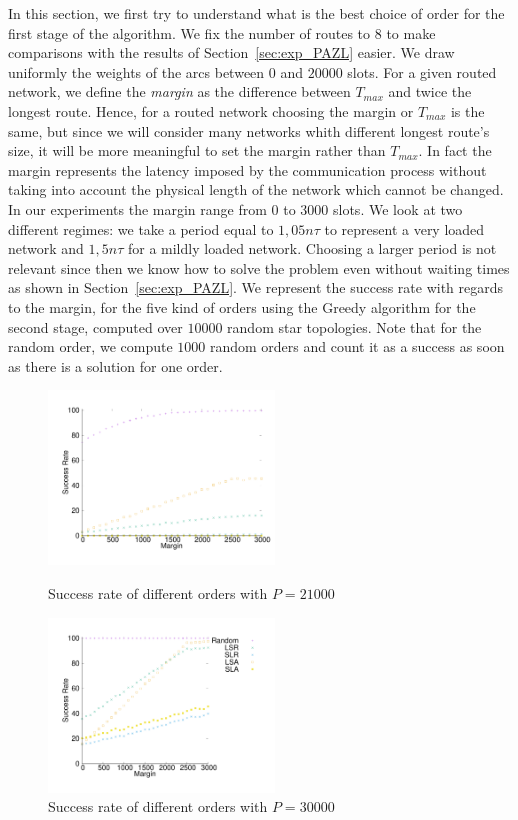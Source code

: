 \documentclass[a4paper,10pt]{article}
\begin{document}
    
    In this section, we first try to understand what is the best choice of order for the first stage of the algorithm.
    We fix the number of routes to $8$ to make comparisons with the results of Section~\ref{sec:exp_PAZL} easier. 
    We draw uniformly the weights of the arcs between $0$ and $20000$ slots.
    For a given routed network, we define the {\em margin} as the difference between $T_{max}$ and twice the longest route. 
    Hence, for a routed network choosing the margin or $T_{max}$ is the same, but since we will consider many networks 
    whith different longest route's size, it will be more meaningful to set the margin rather than $T_{max}$.
    In fact the margin represents the latency imposed by the communication process without taking into account the physical length of the network which cannot be changed. In our experiments the margin range from  $0$ to $3000$ slots.
   We look at two different regimes: we take a period equal to $1,05n\tau$ to represent a very loaded network
   and $1,5n\tau$ for a mildly loaded network. Choosing a larger period is not relevant since then we know how to solve the problem even without waiting times as shown in Section~\ref{sec:exp_PAZL}. We represent the success rate with regards to the margin, for the five kind of orders using the Greedy algorithm for the second stage, computed over $10000$ random star topologies. Note that for the random order, we compute $1000$ random orders and count it as a success as soon as there is a solution for one order. 
 
\begin{figure}[H] 
    \begin{minipage}[c]{6cm}
  \centering
      \includegraphics[width=6cm]{departs_gp_21000.pdf}

      \caption{Success rate of different orders with $P = 21000$}
      \end{minipage} \hfill
        \begin{minipage}[c]{6cm}
          \includegraphics[width=6cm]{departs_gp_30000.pdf}
      \caption{Success rate of different orders with $P = 30000$}

            \end{minipage} \hfill
                  \label{fig:success30000}
     \end{figure}
     
\end{document}
